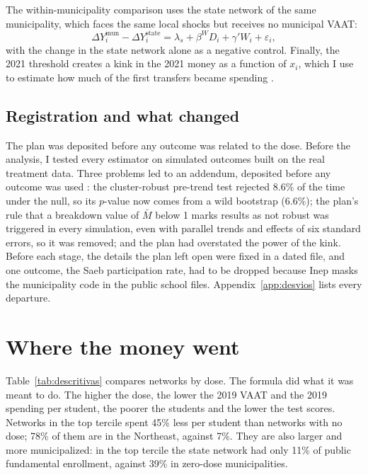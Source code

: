 \documentclass[12pt,letterpaper]{article}
\begin{document}
The within-municipality comparison uses the state network of the same municipality, which faces the same local shocks but receives no municipal VAAT:
\begin{equation}
\Delta Y^{\text{mun}}_i - \Delta Y^{\text{state}}_i = \lambda_s + \beta^{W} D_i + \gamma' W_i + \varepsilon_i ,
\end{equation}
with the change in the state network alone as a negative control. Finally, the 2021 threshold creates a kink in the 2021 money as a function of $x_i$, which I use to estimate how much of the first transfers became spending \citep{card2015,calonico2014}.

\subsection{Registration and what changed}

The plan was deposited before any outcome was related to the dose. Before the analysis, I tested every estimator on simulated outcomes built on the real treatment data. Three problems led to an addendum, deposited before any outcome was used \citep{cunha2026add}: the cluster-robust pre-trend test rejected 8.6\% of the time under the null, so its $p$-value now comes from a wild bootstrap (6.6\%); the plan's rule that a breakdown value of $\bar M$ below 1 marks results as not robust was triggered in every simulation, even with parallel trends and effects of six standard errors, so it was removed; and the plan had overstated the power of the kink. Before each stage, the details the plan left open were fixed in a dated file, and one outcome, the Saeb participation rate, had to be dropped because Inep masks the municipality code in the public school files. Appendix~\ref{app:desvios} lists every departure.

\section{Where the money went}\label{sec:onde}

Table~\ref{tab:descritivas} compares networks by dose. The formula did what it was meant to do. The higher the dose, the lower the 2019 VAAT and the 2019 spending per student, the poorer the students and the lower the test scores. Networks in the top tercile spent 45\% less per student than networks with no dose; 78\% of them are in the Northeast, against 7\%. They are also larger and more municipalized: in the top tercile the state network had only 11\% of public fundamental enrollment, against 39\% in zero-dose municipalities.
\end{document}
